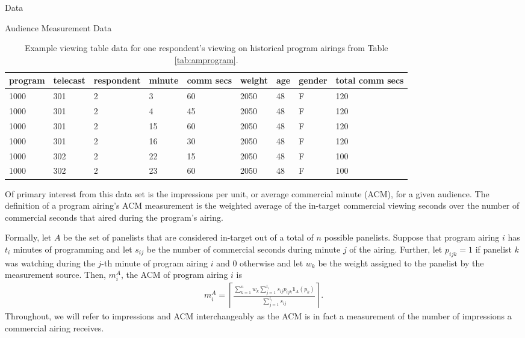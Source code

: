 \begin{chapter}{Data}
\begin{section}{Audience Measurement Data}
  \begin{table}[h!]
    \centering
    \begin{adjustbox}{width=1.1\textwidth,center=\textwidth}
      \large
    \begin{tabular}{lllllllll}
      program & telecast & respondent & minute & comm secs & weight & age & gender & total comm secs\\
      \hline
      1000 & 301 & 2 & 3 & 60 & 2050 & 48 & F & 120\\
      1000 & 301 & 2 & 4 & 45 & 2050 & 48 & F & 120\\
      1000 & 301 & 2 & 15 & 60 & 2050 & 48 & F & 120\\
      1000 & 301 & 2 & 16 & 30 & 2050 & 48 & F & 120\\
      1000 & 302 & 2 & 22 & 15 & 2050 & 48 & F & 100\\
      1000 & 302 & 2 & 23 & 60 & 2050 & 48 & F & 100
    \end{tabular}
    \end{adjustbox}
    \caption{Example viewing table data for one respondent's viewing on historical program airings from Table \ref{tab:amprogram}.}\label{tab:amviewing}
  \end{table}

  Of primary interest from this data set is the impressions per unit,
  or average commercial minute (ACM), for a given audience.
  The definition of a program airing's ACM measurement is the weighted average
  of the in-target commercial viewing seconds over the number of commercial seconds
  that aired during the program's airing.

  Formally, let $A$ be the set of panelists that are considered in-target out of a total of $n$ possible panelists.
  Suppose that program airing $i$ has $t_i$ minutes of programming and let
  $s_{ij}$ be the number of commercial seconds during minute $j$ of the airing.
  Further, let $p_{ijk} = 1$ if panelist $k$ was watching during the $j$-th minute of program airing $i$ and 0 otherwise
  and let $w_{k}$ be the weight assigned to the panelist by the measurement source. Then, $m_{i}^A$, the ACM of program airing $i$
  is
  \begin{align}\label{acm_def}
    m_{i}^A = \left\lceil\frac{\sum_{k=1}^n w_k \sum_{j=1}^{t_i} s_{ij} p_{ijk} \textbf{1}_A(p_{k})}{\sum_{j=1}^{t_i} s_{ij}}\right\rceil.
  \end{align}
  Throughout, we will refer to impressions and ACM interchangeably as the ACM is in fact a measurement
  of the number of impressions a commercial airing receives.


\end{section}
\end{chapter}
